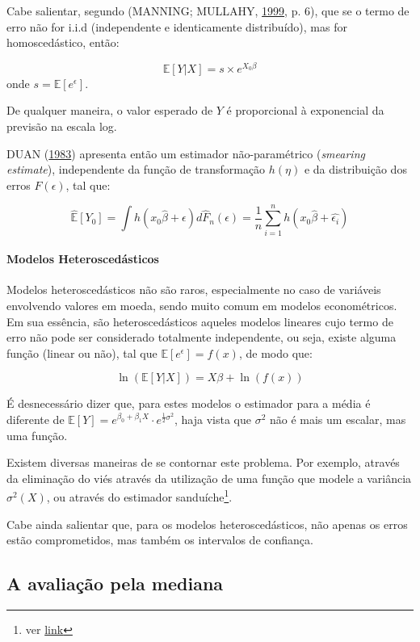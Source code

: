 \documentclass[a4paper, 12pt]{article}
\let\oldparagraph\paragraph
\renewcommand{\paragraph}[1]{\oldparagraph{#1}\mbox{}}
\let\rmarkdownfootnote\footnote%
\def\footnote{\protect\rmarkdownfootnote}
\begin{document}
Cabe salientar, segundo (MANNING; MULLAHY,
\protect\hyperlink{ref-NBERt0246}{1999}, p. 6), que se o termo de erro
não for i.i.d (independente e identicamente distribuído), mas for
homoscedástico, então:

\[\mathbb{E}[Y|X]=s \times e^{X_0\beta}\] onde
\(s = \mathbb{E}[e^\epsilon]\).

De qualquer maneira, o valor esperado de \(Y\) é proporcional à
exponencial da previsão na escala log.

DUAN (\protect\hyperlink{ref-Duan}{1983}) apresenta então um estimador
não-paramétrico (\emph{smearing estimate}), independente da função de
transformação \(h(\eta)\) e da distribuição dos erros \(F(\epsilon)\),
tal que:

\[\hat{\mathbb{E}}[Y_0] = \int h(x_0\hat{\beta} + \epsilon)d\hat{F}_n(\epsilon) = \frac{1}{n}\sum_{i = 1}^{n}h(x_0\hat{\beta}+\hat{\epsilon_i})\]

\paragraph{Modelos Heteroscedásticos}\label{modelos-heteroscedasticos}

Modelos heteroscedásticos não são raros, especialmente no caso de
variáveis envolvendo valores em moeda, sendo muito comum em modelos
econométricos. Em sua essência, são heteroscedásticos aqueles modelos
lineares cujo termo de erro não pode ser considerado totalmente
independente, ou seja, existe alguma função (linear ou não), tal que
\(\mathbb{E}[e^\epsilon] = f(x)\), de modo que:

\[\ln(\mathbb{E}[Y|X]) = X\beta + \ln(f(x))\]

É desnecessário dizer que, para estes modelos o estimador para a média é
diferente de
\(\mathbb{E}[Y] = e^{\beta_0 + \beta_1X} \cdot e^{\frac{1}{2}\sigma^2}\),
haja vista que \(\sigma^2\) não é mais um escalar, mas uma função.

Existem diversas maneiras de se contornar este problema. Por exemplo,
através da eliminação do viés através da utilização de uma função que
modele a variância \(\sigma^2(X)\), ou através do estimador
sanduíche\footnote{ver
  \href{https://matloff.wordpress.com/2015/09/18/can-you-say-heteroscedasticity-3-times-fast/}{link}}.

Cabe ainda salientar que, para os modelos heteroscedásticos, não apenas
os erros estão comprometidos, mas também os intervalos de confiança.

\subsection{A avaliação pela mediana}\label{a-avaliacao-pela-mediana}
\end{document}
